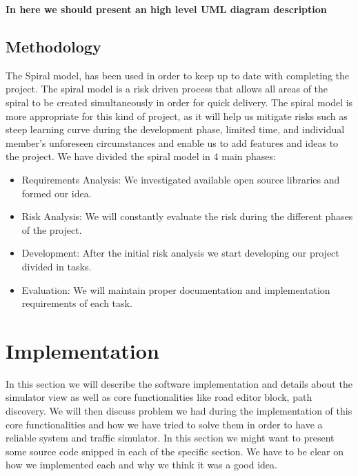 \documentclass[oneside]{article}
\begin{document}
\textbf{In here we should present an high level UML diagram description}

\subsection{Methodology}

\noindent The Spiral model, has been used in order to keep up to date with completing the project. The spiral model is a risk driven process that allows all areas of the spiral to be created simultaneously in order for quick delivery. The spiral model is more appropriate for this kind of project, as it will help us mitigate risks such as steep learning curve during the development phase, limited time, and individual member's unforeseen circumstances and enable us to add features and ideas to the project. We have divided the spiral model in 4 main phases:

 \begin{itemize}
 \setlength\itemsep{-0.5em}
  \item Requirements Analysis: We investigated available open source libraries and formed our idea. 
  \item Risk Analysis: We will constantly evaluate the risk during the different phases of the project. 
  \item Development: After the initial risk analysis we start developing our project divided in tasks.
  \item Evaluation: We will maintain proper documentation and implementation requirements of each task. 	  	  
 \end{itemize}
 
 
\newpage

\section{Implementation}

In this section we will describe the software implementation and details about the simulator view as well as core functionalities like road editor block, path discovery. We will then discuss problem we had during the implementation of this core functionalities and how we have tried to solve them in order to have a reliable system and traffic simulator. 
In this section we might want to present some source code snipped in each of the specific section. We have to be clear on how we implemented each and why we think it was a good idea.
\end{document}
